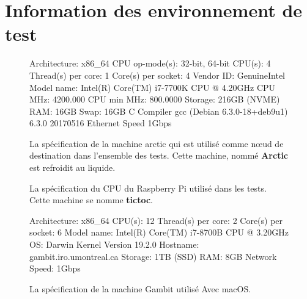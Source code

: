 \chapter{Information des environnement de test}

\begin{figure}[ht]
  \centering
\begin{mplisting}{1}
Architecture:          x86_64
CPU op-mode(s):        32-bit, 64-bit
CPU(s):                4
Thread(s) per core:    1
Core(s) per socket:    4
Vendor ID:             GenuineIntel
Model name:            Intel(R) Core(TM) i7-7700K CPU @ 4.20GHz
CPU MHz:               4200.000
CPU min MHz:           800.0000
Storage:               216GB (NVME)
RAM:                   16GB
Swap:                  16GB
C Compiler             gcc (Debian 6.3.0-18+deb9u1) 6.3.0 20170516
Ethernet Speed         1Gbps
\end{mplisting}
  \caption{La spécification de la machine arctic qui est utilisé comme nœud de destination dans
  l'ensemble des tests. Cette machine, nommé \textbf{Arctic} est refroidit au liquide.}
\end{figure}

\begin{figure}[h]
  \caption{La spécification du CPU du Raspberry Pi utilisé dans les tests.
  Cette machine se nomme \textbf{tictoc}.}
\end{figure}

\begin{figure}[h]
  \begin{mplisting}{1}
Architecture:        x86_64
CPU(s):              12
Thread(s) per core:  2
Core(s) per socket:  6
Model name:          Intel(R) Core(TM) i7-8700B CPU @ 3.20GHz
OS:                  Darwin Kernel Version 19.2.0
Hostname:            gambit.iro.umontreal.ca
Storage:             1TB (SSD)
RAM:                 8GB
Network Speed:       1Gbps
\end{mplisting}
  \caption{La spécification de la machine Gambit utilisé Avec macOS.}
\end{figure}
